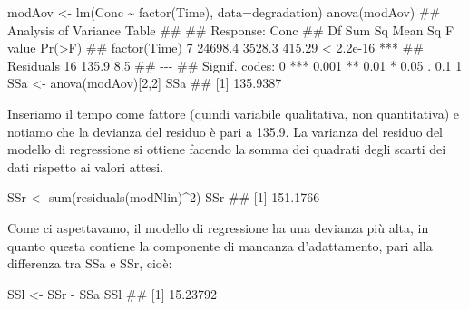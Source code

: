 \documentclass[a4paper,12pt,oneside]{book}
\newenvironment{Shaded}{\begin{snugshade}}{\end{snugshade}}
\newcommand{\DecValTok}[1]{#1}
\newcommand{\SpecialCharTok}[1]{#1}
\newcommand{\DocumentationTok}[1]{#1}
\newcommand{\OtherTok}[1]{#1}
\newcommand{\FunctionTok}[1]{#1}
\newcommand{\AttributeTok}[1]{#1}
\newcommand{\NormalTok}[1]{#1}
\begin{document}
\begin{Shaded}
\begin{Highlighting}[]
\NormalTok{modAov }\OtherTok{\textless{}{-}} \FunctionTok{lm}\NormalTok{(Conc }\SpecialCharTok{\textasciitilde{}} \FunctionTok{factor}\NormalTok{(Time), }\AttributeTok{data=}\NormalTok{degradation)}
\FunctionTok{anova}\NormalTok{(modAov)}
\DocumentationTok{\#\# Analysis of Variance Table}
\DocumentationTok{\#\# }
\DocumentationTok{\#\# Response: Conc}
\DocumentationTok{\#\#              Df  Sum Sq Mean Sq F value    Pr(\textgreater{}F)    }
\DocumentationTok{\#\# factor(Time)  7 24698.4  3528.3  415.29 \textless{} 2.2e{-}16 ***}
\DocumentationTok{\#\# Residuals    16   135.9     8.5                      }
\DocumentationTok{\#\# {-}{-}{-}}
\DocumentationTok{\#\# Signif. codes:  0 \textquotesingle{}***\textquotesingle{} 0.001 \textquotesingle{}**\textquotesingle{} 0.01 \textquotesingle{}*\textquotesingle{} 0.05 \textquotesingle{}.\textquotesingle{} 0.1 \textquotesingle{} \textquotesingle{} 1}
\NormalTok{SSa }\OtherTok{\textless{}{-}} \FunctionTok{anova}\NormalTok{(modAov)[}\DecValTok{2}\NormalTok{,}\DecValTok{2}\NormalTok{]}
\NormalTok{SSa}
\DocumentationTok{\#\# [1] 135.9387}
\end{Highlighting}
\end{Shaded}

Inseriamo il tempo come fattore (quindi variabile qualitativa, non quantitativa) e notiamo che la devianza del residuo è pari a 135.9. La varianza del residuo del modello di regressione si ottiene facendo la somma dei quadrati degli scarti dei dati rispetto ai valori attesi.

\begin{Shaded}
\begin{Highlighting}[]
\NormalTok{SSr }\OtherTok{\textless{}{-}} \FunctionTok{sum}\NormalTok{(}\FunctionTok{residuals}\NormalTok{(modNlin)}\SpecialCharTok{\^{}}\DecValTok{2}\NormalTok{)}
\NormalTok{SSr}
\DocumentationTok{\#\# [1] 151.1766}
\end{Highlighting}
\end{Shaded}

Come ci aspettavamo, il modello di regressione ha una devianza più alta, in quanto questa contiene la componente di mancanza d'adattamento, pari alla differenza tra SSa e SSr, cioè:

\begin{Shaded}
\begin{Highlighting}[]
\NormalTok{SSl }\OtherTok{\textless{}{-}}\NormalTok{ SSr }\SpecialCharTok{{-}}\NormalTok{ SSa}
\NormalTok{SSl}
\DocumentationTok{\#\# [1] 15.23792}
\end{Highlighting}
\end{Shaded}
\end{document}
